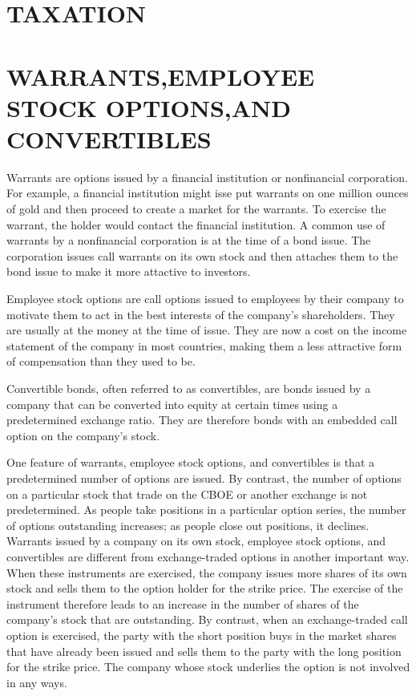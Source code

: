 \documentclass{article}
\begin{document}
\section{TAXATION}

\section{WARRANTS,EMPLOYEE STOCK OPTIONS,AND CONVERTIBLES}
Warrants are options issued by a financial institution or nonfinancial corporation. For example, a financial institution might isse put warrants on one million ounces of gold and then proceed to create a market for the warrants. To exercise the warrant, the holder would contact the financial institution. A common use of warrants by a nonfinancial corporation is at the time of a bond issue. The corporation issues call warrants on its own stock and then attaches them to the bond issue to make it more attactive to investors.

Employee stock options are call options issued to employees by their company to motivate them to act in the best interests of the company's shareholders. They are usually at the money at the time of issue. They are now a cost on the income statement of the company in most countries, making them a less attractive form of compensation than they used to be.

Convertible bonds, often referred to as convertibles, are bonds issued by a company that can be converted into equity at certain times using a predetermined exchange ratio. They are therefore bonds with an embedded call option on the company's stock.

One feature of warrants, employee stock options, and convertibles is that a predetermined number of options are issued. By contrast, the number of options on a particular stock that trade on the CBOE or another exchange is not predetermined. As people take positions in a particular option series, the number of options outstanding increases; as people close out positions, it declines. Warrants issued by a company on its own stock, employee stock options, and convertibles are different from exchange-traded options in another important way. When these instruments are exercised, the company issues more shares of its own stock and sells them to the option holder for the strike price. The exercise of the instrument therefore leads to an increase in the number of shares of the company's stock that are outstanding. By contrast, when an exchange-traded call option is exercised, the party with the short position buys in the market shares that have already been issued and sells them to the party with the long position for the strike price. The company whose stock underlies the option is not involved in any ways.
\end{document}
